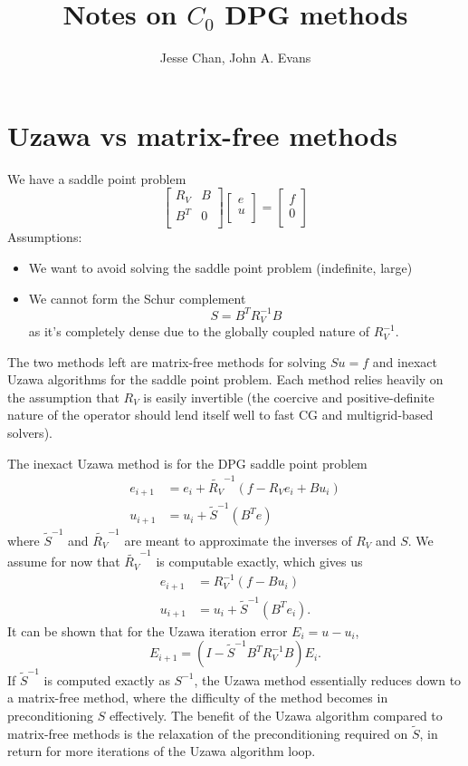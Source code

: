 \documentclass[final,leqno]{siamltex}
\title{Notes on $C_0$ DPG methods}
\author{Jesse Chan, John A. Evans}
\date{}
\newcommand{\LRp}[1]{\left( #1 \right)}
\def\arr#1#2#3#4{\left[
\begin{array}{cc}
#1 & #2\\
#3 & #4\\
\end{array}
\right]}
\def\vecttwo#1#2{\left[
\begin{array}{c}
#1\\
#2\\
\end{array}
\right]}
\begin{document}
\maketitle

\section{Uzawa vs matrix-free methods}
We have a saddle point problem 
\[
\arr{R_V}{B}{B^T}{0}\vecttwo{e}{u} = \vecttwo{f}{0}
\]
Assumptions: 
\begin{itemize}
\item We want to avoid solving the saddle point problem (indefinite, large)
\item We cannot form the Schur complement 
\[
S = B^T R_V^{-1} B
\]
as it's completely dense due to the globally coupled nature of $R_V^{-1}$.
\end{itemize}
The two methods left are matrix-free methods for solving $Su = f$ and inexact Uzawa algorithms for the saddle point problem.  Each method relies heavily on the assumption that $R_V$ is easily invertible (the coercive and positive-definite nature of the operator should lend itself well to fast CG and multigrid-based solvers).  

The inexact Uzawa method is for the DPG saddle point problem
\begin{align*}
e_{i+1} &= e_i + \tilde{R_V}^{-1}\LRp{f - R_V e_i + B u_i}\\
u_{i+1} &= u_i + \tilde{S}^{-1}\LRp{B^T e}
\end{align*}
where $\tilde{S}^{-1}$ and $\tilde{R_V}^{-1}$ are meant to approximate the inverses of $R_V$ and $S$.  We assume for now that $\tilde{R_V}^{-1}$ is computable exactly, which gives us
\begin{align*}
e_{i+1} &= R_V^{-1}(f - Bu_i)\\
u_{i+1} &= u_i + \tilde{S}^{-1}\LRp{B^T e_i}.
\end{align*}
It can be shown that for the Uzawa iteration error $E_i = u-u_i$,
\[
E_{i+1} = \LRp{I-\tilde{S}^{-1}B^TR_V^{-1}B}E_i.
\]
If $\tilde{S}^{-1}$ is computed exactly as $S^{-1}$, the Uzawa method essentially reduces down to a matrix-free method, where the difficulty of the method becomes in preconditioning ${S}$ effectively.  The benefit of the Uzawa algorithm compared to matrix-free methods is the relaxation of the preconditioning required on $\tilde{S}$, in return for more iterations of the Uzawa algorithm loop.  
\end{document}

